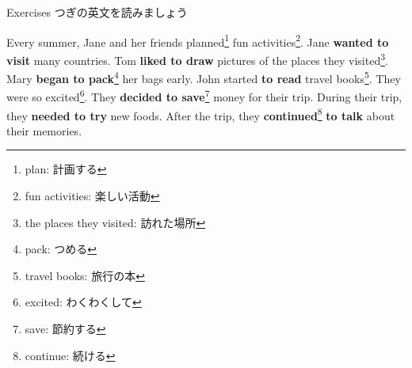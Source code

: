 \documentclass[aspectratio=169,xcolor={dvipsnames,table}]{beamer}
\begin{document}
\begin{frame}[plain]{Exercises}
つぎの英文を読みましょう%
\hfill{\scriptsize {}}

Every summer, Jane and her friends planned\footnote{plan: 計画する} fun activities\footnote{fun activities: 楽しい活動}.
Jane {\bfseries wanted to visit} many countries.
Tom {\bfseries liked to draw} pictures of the places they visited\footnote{the places they visited: 訪れた場所}.
Mary {\bfseries began to pack}\footnote{pack: つめる} her bags early.
John started {\bfseries to read} travel books\footnote{travel books: 旅行の本}.
They were so excited\footnote{excited: わくわくして}.
They {\bfseries decided to save}\footnote{save: 節約する} money for their trip.
During their trip, they {\bfseries needed to try} new foods.
After the trip, they { \bfseries continued}\footnote{continue: 続ける} {\bfseries to talk} about their memories.
\end{frame}
\end{document}

